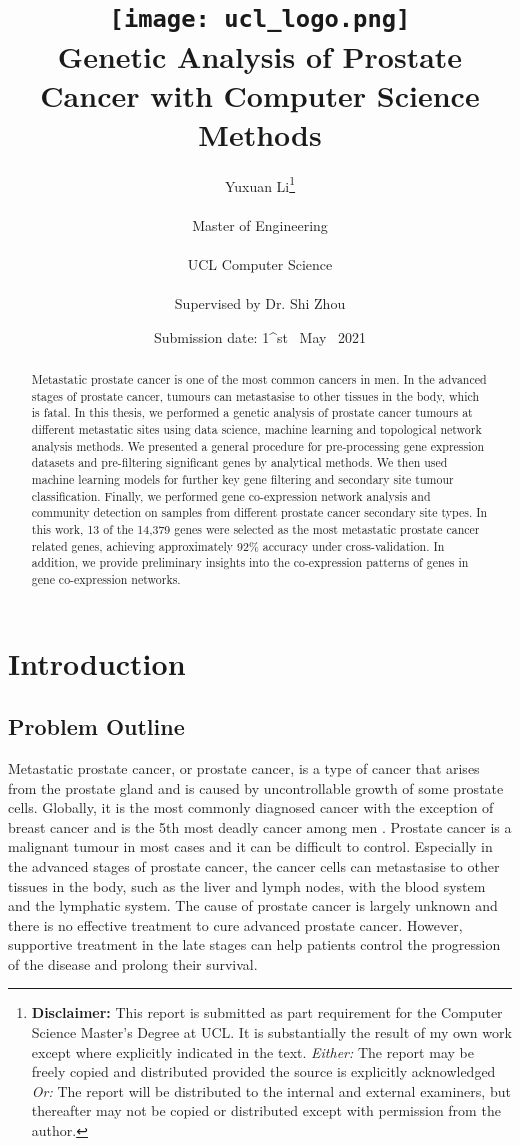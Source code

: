 \documentclass[12pt,a4paper]{report}
\title{{\vspace{-14em} \texttt{[image: ucl\_logo.png]}}\\
{{\Huge Genetic Analysis of Prostate Cancer with Computer Science Methods}}\\
}
\date{Submission date: 1^{st} \ May \ 2021}
\author{Yuxuan Li\thanks{
{\bf Disclaimer:}
This report is submitted as part requirement for the Computer Science Master's Degree at UCL. It is
substantially the result of my own work except where explicitly indicated in the text.
\emph{Either:} The report may be freely copied and distributed provided the source is explicitly acknowledged
\newline  %
\emph{Or:}\newline
The report will be distributed to the internal and external examiners, but thereafter may not be copied or distributed except with permission from the author.}
\\ \\
Master of Engineering\\ \\
UCL Computer Science \\ \\
Supervised by Dr. Shi Zhou
}
\begin{document}
 
\onehalfspacing
\maketitle
\begin{abstract}
Metastatic prostate cancer is one of the most common cancers in men. In the advanced stages of prostate cancer, tumours can metastasise to other tissues in the body, which is fatal. In this thesis, we performed a genetic analysis of prostate cancer tumours at different metastatic sites using data science, machine learning and topological network analysis methods. We presented a general procedure for pre-processing gene expression datasets and pre-filtering significant genes by analytical methods. We then used machine learning models for further key gene filtering and secondary site tumour classification. Finally, we performed gene co-expression network analysis and community detection on samples from different prostate cancer secondary site types. In this work, 13 of the 14,379 genes were selected as the most metastatic prostate cancer related genes, achieving approximately 92\% accuracy under cross-validation. In addition, we provide preliminary insights into the co-expression patterns of genes in gene co-expression networks.
\end{abstract}
\tableofcontents
\setcounter{page}{1}


\chapter{Introduction}

\section{Problem Outline}
Metastatic prostate cancer, or prostate cancer, is a type of cancer that arises from the prostate gland and is caused by uncontrollable growth of some prostate cells. Globally, it is the most commonly diagnosed cancer with the exception of breast cancer and is the 5th most deadly cancer among men \cite{WHO14}. Prostate cancer is a malignant tumour in most cases and it can be difficult to control. Especially in the advanced stages of prostate cancer, the cancer cells can metastasise to other tissues in the body, such as the liver and lymph nodes, with the blood system and the lymphatic system. The cause of prostate cancer is largely unknown and there is no effective treatment to cure advanced prostate cancer. However, supportive treatment in the late stages can help patients control the progression of the disease and prolong their survival. \\
\end{document}
